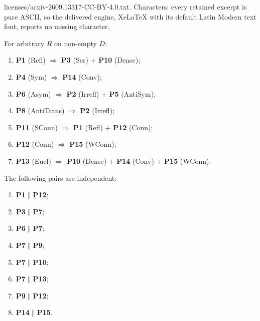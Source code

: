 \documentclass[10pt,a4paper]{amsart}
\newcommand{\catentails}{\Rightarrow}
\newcommand{\pabbr}[1]{\textsf{#1}}
\newcommand{\prop}[1]{\textbf{P#1}}
\begin{document}
licenses/arxiv-2609.13317-CC-BY-4.0.txt. Characters: every retained excerpt is pure ASCII, so the delivered engine, XeLaTeX with its default Latin Modern text font, reports no missing character.
\begin{proposition}\label{prop:solo}
For arbitrary $R$ on non-empty $D$:
\begin{enumerate}[label=(\roman*),noitemsep]
\item \prop{1} (\pabbr{Refl}) $\catentails$
      \prop{3} (\pabbr{Ser}) + \prop{10} (\pabbr{Dense});
\item \prop{4} (\pabbr{Sym}) $\catentails$ \prop{14} (\pabbr{Conv});
\item \prop{6} (\pabbr{Asym}) $\catentails$
      \prop{2} (\pabbr{Irrefl}) + \prop{5} (\pabbr{AntiSym});
\item \prop{8} (\pabbr{AntiTrans}) $\catentails$ \prop{2} (\pabbr{Irrefl});
\item \prop{11} (\pabbr{SConn}) $\catentails$
      \prop{1} (\pabbr{Refl}) + \prop{12} (\pabbr{Conn});
\item \prop{12} (\pabbr{Conn}) $\catentails$ \prop{15} (\pabbr{WConn});
\item \prop{13} (\pabbr{Eucl}) $\catentails$
      \prop{10} (\pabbr{Dense}) + \prop{14} (\pabbr{Conv}) +
      \prop{15} (\pabbr{WConn}).
\end{enumerate}
\end{proposition}

\begin{proposition}\label{prop:independence}
The following pairs are independent:
\begin{enumerate}[label=(\roman*),noitemsep]
\item \prop{1}$\parallel$\prop{12};
\item \prop{3}$\parallel$\prop{7};
\item \prop{6}$\parallel$\prop{7};
\item \prop{7}$\parallel$\prop{9};
\item \prop{7}$\parallel$\prop{10};
\item \prop{7}$\parallel$\prop{13};
\item \prop{9}$\parallel$\prop{12};
\item \prop{14}$\parallel$\prop{15}.
\end{enumerate}
\end{proposition}
\end{document}
